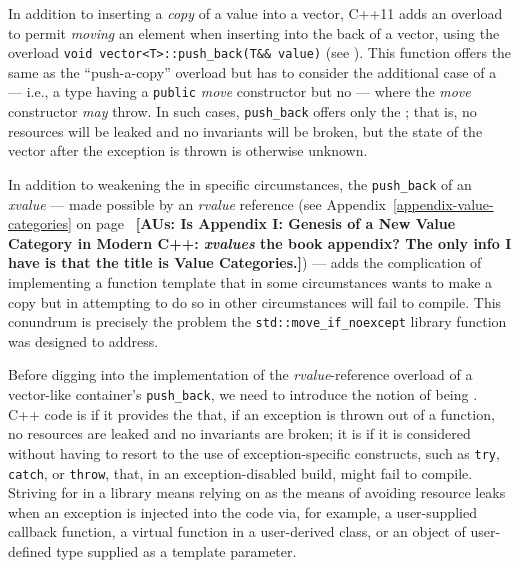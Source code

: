In addition to inserting a \emph{copy} of a value into a vector, C++11
adds an overload to permit \emph{moving} an element when inserting into
the back of a vector, using the overload
\lstinline!void!~\lstinline!vector<T>::push_back(T&&!~\lstinline!value)! (see
). This function offers the same
 as the ``push-a-copy''
overload but has to consider the additional case of a  --- i.e., a type having a \lstinline!public! \emph{move} constructor
but no  --- where the \emph{move} constructor \emph{may} throw. In such cases, \lstinline!push_back! offers
only the ; that is, no
resources will be leaked and no invariants will be broken, but the state
of the vector after the exception is thrown is otherwise unknown.

In addition to weakening the 
in specific circumstances, the \lstinline!push_back! of an \emph{xvalue}
--- made possible by an \emph{rvalue} reference (see Appendix~\ref{appendix-value-categories} on page~\pageref{appendix-value-categories} \textbf{[AUs: Is Appendix I: Genesis of a New Value Category in Modern C++: \emph{xvalues} the book appendix? The only info I have is that the title is Value Categories.]}) --- adds the complication of implementing a function
template that in some circumstances wants to make a copy but in
attempting to do so in other circumstances will fail to compile. This
conundrum is precisely the problem the \lstinline!std::move_if_noexcept!
library function was designed to address.

Before digging into the implementation of the \emph{rvalue}-reference
overload of a vector-like container's \lstinline!push_back!, we need to
introduce the notion of being . C++ code is
 if it provides the 
that, if an exception is thrown out of a function, no resources are
leaked and no invariants are broken; it is 
if it is considered  without having to resort to
the use of exception-specific constructs, such as \lstinline!try!,
\lstinline!catch!, or \lstinline!throw!, that, in an exception-disabled build,
might fail to compile. Striving for  in a
library means relying on  as the means of avoiding resource
leaks when an exception is injected into the code via, for example, a
user-supplied callback function, a virtual function in a user-derived
class, or an object of user-defined type supplied as a template
parameter.

